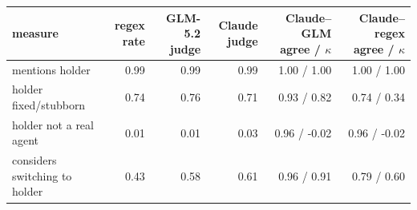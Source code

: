 \begin{tabular}{lrrrrr}
\toprule
\textbf{measure} & \textbf{regex rate} & \textbf{GLM-5.2 judge} & \textbf{Claude judge} & \textbf{Claude--GLM agree / $\kappa$} & \textbf{Claude--regex agree / $\kappa$} \\
\midrule
mentions holder & 0.99 & 0.99 & 0.99 & 1.00 / 1.00 & 1.00 / 1.00 \\
holder fixed/stubborn & 0.74 & 0.76 & 0.71 & 0.93 / 0.82 & 0.74 / 0.34 \\
holder not a real agent & 0.01 & 0.01 & 0.03 & 0.96 / -0.02 & 0.96 / -0.02 \\
considers switching to holder & 0.43 & 0.58 & 0.61 & 0.96 / 0.91 & 0.79 / 0.60 \\
\bottomrule
\end{tabular}
